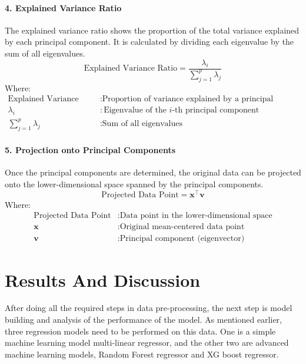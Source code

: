 \documentclass[12pt, a4paper,oneside]{book}
\numberwithin{equation}{section}
\begin{document}
\subsubsection*{4. Explained Variance Ratio}
The explained variance ratio shows the proportion of the total variance explained by each principal component. It is calculated by dividing each eigenvalue by the sum of all eigenvalues.~\cite{ref14}
\begin{equation}
\text{Explained Variance Ratio} = \frac{\lambda_i}{\sum_{j=1}^{p} \lambda_j}
\end{equation}
Where:
\begin{align*}
\text{Explained Variance Ratio} &: \text{Proportion of variance explained by a principal component} \\
\lambda_i &: \text{Eigenvalue of the \(i\)-th principal component} \\
\sum_{j=1}^{p} \lambda_j &: \text{Sum of all eigenvalues}
\end{align*}

\subsubsection*{5. Projection onto Principal Components}
Once the principal components are determined, the original data can be projected onto the lower-dimensional space spanned by the principal components.
\begin{equation}
\text{Projected Data Point} = \mathbf{x}^\top \mathbf{v}
\end{equation}
Where:
\begin{align*}
\text{Projected Data Point} &: \text{Data point in the lower-dimensional space} \\
\mathbf{x} &: \text{Original mean-centered data point} \\
\mathbf{v} &: \text{Principal component (eigenvector)}
\end{align*}





\chapter{Results And Discussion}

After doing all the required steps in data pre-processing, the next step is model building and analysis of the performance of the model. As mentioned earlier, three regression models need to be performed on this data. One is a simple machine learning model multi-linear regressor, and the other two are advanced machine learning models, Random Forest regressor and XG boost regressor.
\end{document}
